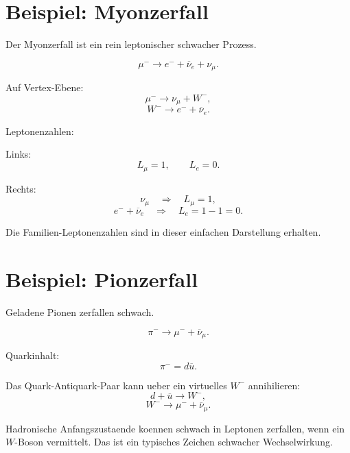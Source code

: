 \section{Beispiel: Myonzerfall}

Der Myonzerfall ist ein rein leptonischer schwacher Prozess.

\begin{formulabox}
\[
    \mu^- \rightarrow e^- + \overline{\nu}_e + \nu_\mu.
\]
\end{formulabox}

\begin{conceptbox}
Auf Vertex-Ebene:
\[
    \mu^- \rightarrow \nu_\mu + W^-,
\]
\[
    W^- \rightarrow e^- + \overline{\nu}_e.
\]
\end{conceptbox}

\begin{examplebox}
Leptonenzahlen:

Links:
\[
    L_\mu=1,
    \qquad
    L_e=0.
\]

Rechts:
\[
    \nu_\mu
    \quad\Rightarrow\quad
    L_\mu=1,
\]
\[
    e^-+\overline{\nu}_e
    \quad\Rightarrow\quad
    L_e=1-1=0.
\]

Die Familien-Leptonenzahlen sind in dieser einfachen Darstellung erhalten.
\end{examplebox}

\section{Beispiel: Pionzerfall}

Geladene Pionen zerfallen schwach.

\begin{formulabox}
\[
    \pi^- \rightarrow \mu^- + \overline{\nu}_\mu.
\]
\end{formulabox}

\begin{conceptbox}
Quarkinhalt:
\[
    \pi^- = d\overline{u}.
\]

Das Quark-Antiquark-Paar kann ueber ein virtuelles $W^-$ annihilieren:
\[
    d+\overline{u}\rightarrow W^-,
\]
\[
    W^- \rightarrow \mu^-+\overline{\nu}_\mu.
\]
\end{conceptbox}

\begin{examtipbox}
Hadronische Anfangszustaende koennen schwach in Leptonen zerfallen, wenn ein
$W$-Boson vermittelt.
Das ist ein typisches Zeichen schwacher Wechselwirkung.
\end{examtipbox}

